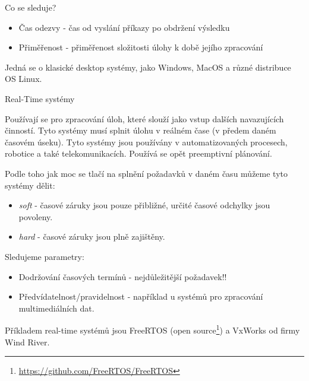 \vspace{0,5cm}
Co se sleduje?
\begin{itemize}
    \item Čas odezvy - čas od vyslání příkazy po obdržení výsledku
    \item Přiměřenost - přiměřenost složitosti úlohy k době jejího zpracování
\end{itemize}

\vspace{0,5cm}

Jedná se o klasické desktop systémy, jako Windows, MacOS a různé distribuce OS Linux. 

\begin{large}
    \vspace{0,5cm}
    Real-Time systémy
\end{large}

Používají se pro zpracování úloh, které slouží jako vstup dalších navazujících činností. Tyto systémy musí splnit úlohu v reálném čase (v předem daném časovém úseku). Tyto systémy jsou používány v automatizovaných procesech, robotice a také telekomunikacích. Používá se opět preemptivní plánování. 

\vspace{0,5cm}

Podle toho jak moc se tlačí na splnění požadavků v daném času můžeme tyto systémy dělit:

\begin{itemize}
    \item \textit{soft} - časové záruky jsou pouze přibližné, určité časové odchylky jsou povoleny.
    \item \textit{hard} - časové záruky jsou plně zajištěny. 
\end{itemize}

\vspace{0,5cm}

Sledujeme parametry:

\begin{itemize}
    \item Dodržování časových termínů - nejdůležitější požadavek!!
    \item Předvídatelnost/pravidelnost - například u systémů pro zpracování multimediálních dat.
\end{itemize}

\vspace{0,5cm}
Příkladem real-time systémů jsou FreeRTOS (open source\footnote{\url{https://github.com/FreeRTOS/FreeRTOS}}) a VxWorks od firmy Wind River. 

